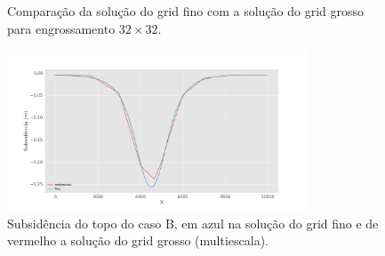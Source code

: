 \begin{figure}[h]
\center
{}
\qquad
{}
\caption{Comparação da solução do grid fino com a solução do grid grosso para engrossamento $32\times32$.  }
\label{fig:comparacaoFinoGrosso}
\end{figure}



\begin{figure}[!htbp]
\centering
\includegraphics[width=0.8\textwidth]{chap08/figs/Reservoir320x320_10x10_subsidence_multiscale.png}
\caption{Subsidência do topo do caso B, em azul na solução do grid fino e de vermelho a solução do grid grosso (multiescala). }
\label{fig:subsidence} 
\end{figure}

